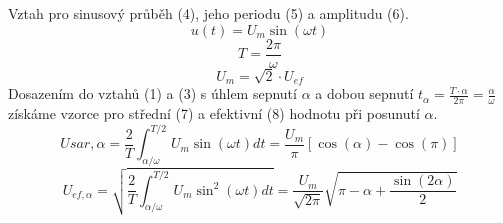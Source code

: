 \documentclass{article}
\begin{document}
Vztah pro sinusový průběh (4), jeho periodu (5) a amplitudu (6).
\begin{equation}
	u(t)=U_m\sin(\omega t)
\end{equation}
\begin{equation}
	T=\frac{2 \pi}{\omega}
\end{equation}
\begin{equation}
	U_m=\sqrt{2}\cdot U_{ef}
\end{equation}
Dosazením do vztahů (1) a (3) s úhlem sepnutí $\alpha$ a dobou sepnutí $t_\alpha = \frac{T\cdot\alpha}{2\pi}=\frac{\alpha}{\omega}$ získáme vzorce pro střední (7) a efektivní (8) hodnotu při posunutí $\alpha$.
\begin{equation}
	U{sar,\alpha}=\frac{2}{T}\int_{\alpha/\omega}^{T/2}U_m\sin(\omega t)dt=\frac{U_m}{\pi}[\cos(\alpha)-\cos(\pi)]
\end{equation}
\begin{equation}
	U_{ef,\alpha}=\sqrt{\frac{2}{T}\int_{\alpha/\omega}^{T/2}U_m\sin^2(\omega t)dt} = \frac{U_m}{\sqrt{2\pi}}\sqrt{\pi-\alpha+\frac{\sin(2\alpha)}{2}}
\end{equation}
\end{document}
